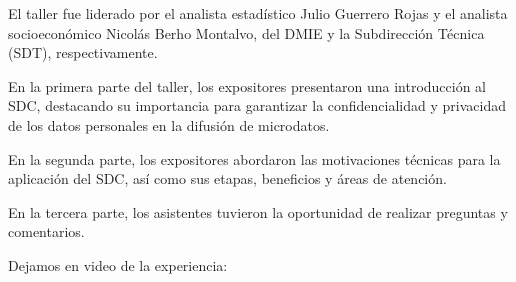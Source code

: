 \documentclass[
]{book}
\theoremstyle{definition}
\theoremstyle{definition}
\theoremstyle{definition}
\theoremstyle{definition}
\theoremstyle{remark}
\begin{document}
El taller fue liderado por el analista estadístico Julio Guerrero Rojas y el analista socioeconómico Nicolás Berho Montalvo, del DMIE y la Subdirección Técnica (SDT), respectivamente.

En la primera parte del taller, los expositores presentaron una introducción al SDC, destacando su importancia para garantizar la confidencialidad y privacidad de los datos personales en la difusión de microdatos.

En la segunda parte, los expositores abordaron las motivaciones técnicas para la aplicación del SDC, así como sus etapas, beneficios y áreas de atención.

En la tercera parte, los asistentes tuvieron la oportunidad de realizar preguntas y comentarios.

Dejamos en video de la experiencia:

  
\end{document}
